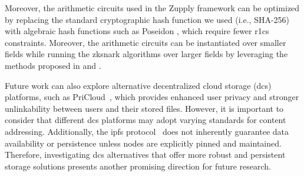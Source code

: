 Moreover, the arithmetic circuits used in the Zupply framework can be optimized by replacing the standard cryptographic hash function we used (i.e., SHA-256) with algebraic hash functions such as Poseidon \cite{Grassi2021Poseidon}, which require fewer \gls{r1cs} constraints. Moreover, the arithmetic circuits can be instantiated over smaller fields while running the \gls{zksnark} algorithms over larger fields by leveraging the methods proposed in \cite{Diamond2023Towers} and \cite{Gong2024}.


Future work can also explore alternative decentralized cloud storage (\gls{dcs}) platforms, such as PriCloud~\cite{Kopp2021PriCloud}, which provides enhanced user privacy and stronger unlinkability between users and their stored files. However, it is important to consider that different \gls{dcs} platforms may adopt varying standards for content addressing. Additionally, the \gls{ipfs} protocol~\cite{Benet2014} does not inherently guarantee data availability or persistence unless nodes are explicitly pinned and maintained. Therefore, investigating \gls{dcs} alternatives that offer more robust and persistent storage solutions presents another promising direction for future research.
